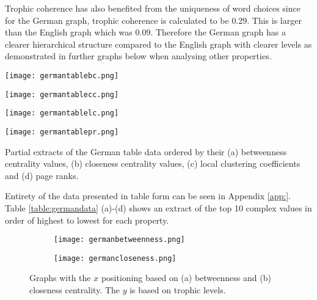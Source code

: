Trophic coherence has also benefited from the uniqueness of word choices since for the German graph, trophic coherence is calculated to be $0.29$. This is larger than the English graph which was $0.09$. Therefore the German graph has a clearer hierarchical structure compared to the English graph with clearer levels as demonstrated in further graphs below when analysing other properties.

\begin{table}[!htb]
\centering
\begin{subtable}{.2\textwidth}
	\centering
	\texttt{[image: germantablebc.png]}
	\caption{}
	\label{table:germantablebc}
\end{subtable}
\hfill
\begin{subtable}{.2\textwidth}
	\centering
	\texttt{[image: germantablecc.png]}
	\caption{}
	\label{table:germantablecc}
\end{subtable}
\hfill
\begin{subtable}{.2\textwidth}
	\centering
	\texttt{[image: germantablelc.png]}
	\caption{}
	\label{table:germantablelc}
\end{subtable}
\hfill
\begin{subtable}{.2\textwidth}
	\centering
	\texttt{[image: germantablepr.png]}
	\caption{}
	\label{table:germantablepr}
\end{subtable}
\caption{Partial extracts of the German table data ordered by their (a) betweenness centrality values, (b) closeness centrality values, (c) local clustering coefficients and (d) page ranks.}
\label{table:germandata}
\end{table}

Entirety of the data presented in table form can be seen in Appendix \ref{app:}. Table \ref{table:germandata} (a)-(d) shows an extract of the top 10 complex values in order of highest to lowest for each property.

\begin{figure}[!htb]
\centering
\begin{subfigure}{.45\textwidth}
	\hspace{-1cm} 
	\texttt{[image: germanbetweenness.png]}
	\caption{}
	\label{fig:gerbc}
\end{subfigure}
\hfill
\begin{subfigure}{.45\textwidth}
	\hspace{-1cm} 
	\texttt{[image: germancloseness.png]}
	\caption{ }
	\label{fig:gercc}
\end{subfigure}
\caption{Graphs with the $x$ positioning based on (a) betweenness and (b) closeness centrality. The $y$ is based on trophic levels.}
\label{fig:gercentrality}
\end{figure}

